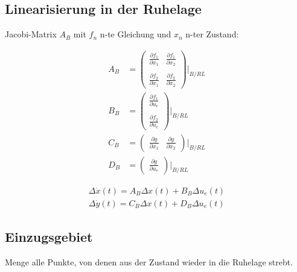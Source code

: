 \documentclass[10pt,a4paper]{article}
\begin{document}
  \subsection{Linearisierung in der Ruhelage}
Jacobi-Matrix $A_B$ mit $f_n$ n-te Gleichung und $x_n$ n-ter Zustand:
  \begin{mdframed}[style=exercise]
    \begin{align}
        A_B &= 
        \begin{pmatrix}
            \frac{\partial f_1}{\partial x_1} & \frac{\partial f_1}{\partial x_2} \\ \\
            \frac{\partial f_2}{\partial x_1} & \frac{\partial f_2}{\partial x_2} 
        \end{pmatrix}|_{B/RL} \\
        B_B &= 
        \begin{pmatrix}
            \frac{\partial f_1}{\partial u_e}  \\ \\
            \frac{\partial f_2}{\partial u_e}  
        \end{pmatrix}|_{B/RL} \\
        C_B &= 
        \begin{pmatrix}
            \frac{\partial g}{\partial x_1} & \frac{\partial g}{\partial x_2}  
        \end{pmatrix}|_{B/RL} \\
        D_B &= 
        \begin{pmatrix}
            \frac{\partial g}{\partial u_e}
        \end{pmatrix}|_{B/RL} 
    \end{align}
  \end{mdframed}
  \begin{mdframed}[style=exercise]
    \begin{align}
        \Delta \dot{x}(t) = A_B \Delta x(t) + B_B \Delta u_e(t) \\
        \Delta \dot{y}(t) = C_B \Delta x(t) + D_B \Delta u_e(t)
    \end{align}
  \end{mdframed}

  \subsection{Einzugsgebiet}
  Menge alle Punkte, von denen aus der Zustand wieder in die Ruhelage strebt.
\end{document}
